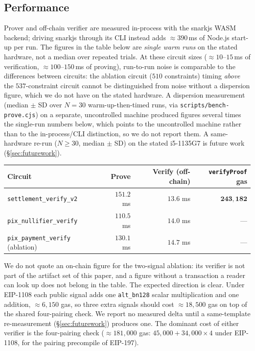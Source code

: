 \documentclass[11pt]{article}
\newcommand{\code}[1]{\texttt{#1}}
\begin{document}
\subsection{Performance}
Prover and off-chain verifier are measured in-process with the snarkjs WASM
backend; driving snarkjs through its CLI instead adds $\approx 390$\,ms of
Node.js start-up per run. The figures in the table below are \emph{single warm
runs} on the stated hardware, not a median over repeated trials. At these
circuit sizes ($\approx 10$--$15$\,ms of verification, $\approx 100$--$150$\,ms
of proving), run-to-run noise is comparable to the differences between
circuits: the ablation circuit ($510$ constraints) timing \emph{above} the
$537$-constraint circuit cannot be distinguished from noise without a
dispersion figure, which we do not have on the stated hardware. A dispersion
measurement (median $\pm$ SD over $N=30$ warm-up-then-timed runs, via
\code{scripts/bench-prove.cjs}) on a separate, uncontrolled machine produced
figures several times the single-run numbers below, which points to the
uncontrolled machine rather than to the in-process/CLI distinction, so we do
not report them. A same-hardware re-run ($N\geq30$, median $\pm$ SD) on the
stated i5-1135G7 is future work (\S\ref{sec:futurework}).

\begin{center}
\small
\begin{tabular}{@{}lrrr@{}}
\toprule
\textbf{Circuit} & \textbf{Prove} & \textbf{Verify (off-chain)} & \textbf{\code{verifyProof} gas} \\
\midrule
\code{settlement\_verify\_v2} & $151.2$ ms & $13.6$ ms & $\mathbf{243{,}182}$ \\
\code{pix\_nullifier\_verify}      & $110.5$ ms & $14.0$ ms & --- \\
\code{pix\_payment\_verify} (ablation) & $130.1$ ms & $14.7$ ms & --- \\
\bottomrule
\end{tabular}
\end{center}

\noindent We do not quote an on-chain figure for the two-signal ablation: its
verifier is not part of the artifact set of this paper, and a figure without a
transaction a reader can look up does not belong in the table. The expected
direction is clear. Under EIP-1108 each public signal adds one
\code{alt\_bn128} scalar multiplication and one addition, $\approx 6{,}150$ gas,
so three extra signals should cost $\approx 18{,}500$ gas on top of the shared
four-pairing check. We report no measured delta until a same-template
re-measurement (\S\ref{sec:futurework}) produces one. The dominant cost of
either verifier is the four-pairing check ($\approx 181{,}000$ gas:
$45{,}000 + 34{,}000\times 4$ under EIP-1108, for the pairing precompile of
EIP-197).
\end{document}
